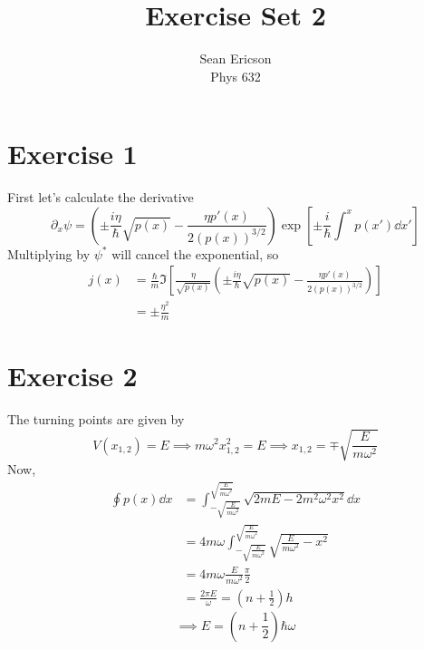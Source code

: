 \documentclass[12pt]{article}
\newcommand{\cint}[2]{\int_{#1}^{#2}}
\begin{document}
	
\title{Exercise Set 2}
\author{Sean Ericson \\ Phys 632}
\maketitle

\section*{Exercise 1}
First let's calculate the derivative
\[ \partial_x\psi = \left(\pm\frac{i\eta}{\hbar} \sqrt{p(x)} -\frac{\eta p'(x)}{2(p(x))^{3/2}}\right) \exp[\pm \frac{i}{\hbar}\int^x p(x') \dd x' ] \]
Multiplying by $\psi^*$ will cancel the exponential, so
\begin{align*}
    j(x) & = \frac{\hbar}{m}\Im\left[\frac{\eta}{\sqrt{p(x)}}\left(\pm\frac{i\eta}{\hbar} \sqrt{p(x)} -\frac{\eta p'(x)}{2(p(x))^{3/2}}\right)\right] \\
    & = \pm \frac{\eta^2}{m}
\end{align*}


\section*{Exercise 2}
The turning points are given by
\[ V(x_{1,2}) = E \implies m\omega^2x_{1,2}^2 = E \implies x_{1,2} = \mp\sqrt{\frac{E}{m\omega^2}} \]
Now,
\begin{align*}
    \oint p(x)\dd x & = \cint{-\sqrt{\frac{E}{m\omega^2}}}{\sqrt{\frac{E}{m\omega^2}}} \sqrt{2mE - 2m^2\omega^2x^2} \dd x \\
    & = 4m\omega \cint{-\sqrt{\frac{E}{m\omega^2}}}{\sqrt{\frac{E}{m\omega^2}}} \sqrt{\frac{E}{m\omega^2} - x^2} \\
    & = 4m\omega \frac{E}{m\omega^2}\frac{\pi}{2} \\
    & = \frac{2\pi E}{\omega}  = \left(n + \frac{1}{2}\right)h
\end{align*}
\[ \implies E = \left(n + \frac{1}{2}\right)\hbar\omega \]    
\end{document}
